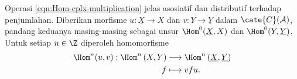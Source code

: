 Operasi \eqref{eqn:Hom-cplx-multiplication} jelas asosiatif dan distributif
terhadap penjumlahan. Diberikan morfisme $u:\underline{X}\to X$ dan
$v:Y\to\underline{Y}$ dalam $\cate{C}(\mathcal{A})$, pandang keduanya
masing-masing sebagai unsur $\Hom^0(\underline{X},X)$ dan
$\Hom^0(Y,\underline{Y})$. Untuk setiap $n\in\Z$ diperoleh homomorfisme
\begin{equation}\label{eqn:Hom-cplx-functoriality}\begin{aligned}
	\Hom^n(u, v): \Hom^n\left( X, Y\right) & \longrightarrow \Hom^n\left(\underline{X}, \underline{Y}\right) \\
	f & \longmapsto vfu.
\end{aligned}\end{equation}

